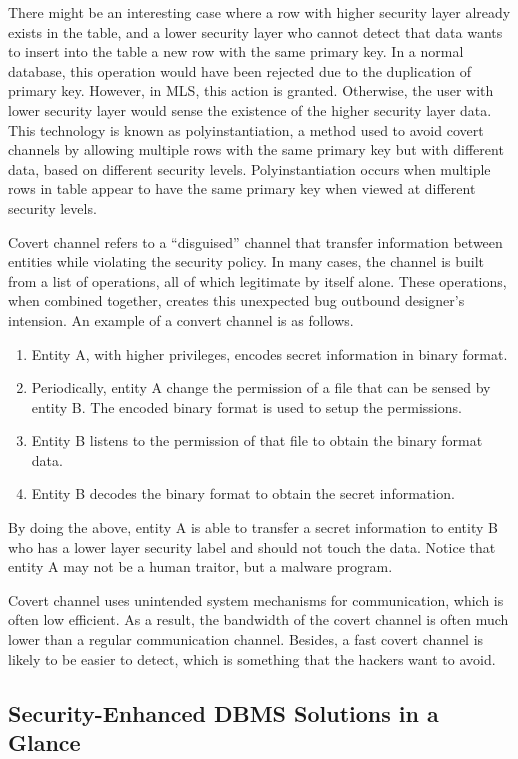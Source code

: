 There might be an interesting case where a row with higher security layer already exists in the table, and a lower security layer who cannot detect that data wants to insert into the table a new row with the same primary key. In a normal database, this operation would have been rejected due to the duplication of primary key. However, in MLS, this action is granted. Otherwise, the user with lower security layer would sense the existence of the higher security layer data. This technology is known as polyinstantiation, a method used to avoid covert channels by allowing multiple rows with the same primary key but with different data, based on different security levels. Polyinstantiation occurs when multiple rows in table appear to have the same primary key when viewed at different security levels.

Covert channel refers to a ``disguised'' channel that transfer information between entities while violating the security policy. In many cases, the channel is built from a list of operations, all of which legitimate by itself alone. These operations, when combined together, creates this unexpected bug outbound designer's intension. An example of a convert channel is as follows.
\begin{enumerate}
  \item Entity A, with higher privileges, encodes secret information in binary format.
  \item Periodically, entity A change the permission of a file that can be sensed by entity B. The encoded binary format is used to setup the permissions.
  \item Entity B listens to the permission of that file to obtain the binary format data.
  \item Entity B decodes the binary format to obtain the secret information.
\end{enumerate}
By doing the above, entity A is able to transfer a secret information to entity B who has a lower layer security label and should not touch the data. Notice that entity A may not be a human traitor, but a malware program.

Covert channel uses unintended system mechanisms for communication, which is often low efficient. As a result, the bandwidth of the covert channel is often much lower than a regular communication channel. Besides, a fast covert channel is likely to be easier to detect, which is something that the hackers want to avoid.

\subsection{Security-Enhanced DBMS Solutions in a Glance}

